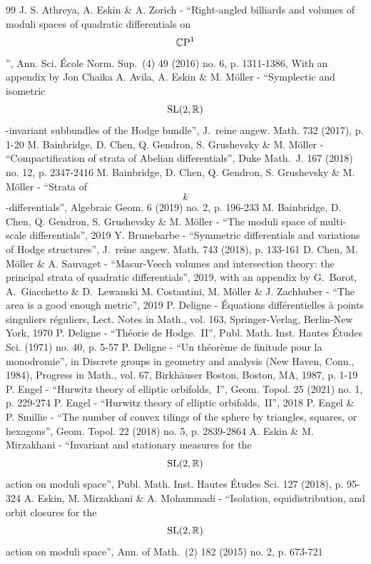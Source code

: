 \documentclass[10pt]{amsart}
\theoremstyle{plain}
\theoremstyle{definition}
\begin{document}
\begin{thebibliography}{99}
 J. S. Athreya, A. Eskin \& A. Zorich - “Right-angled billiards and volumes of moduli spaces of quadratic differentials on $$\mathbb{C}\rm P^1$$”, Ann. Sci. École Norm. Sup. (4) 49 (2016) no. 6, p. 1311-1386, With an appendix by Jon Chaika
 A. Avila, A. Eskin \& M. Möller - “Symplectic and isometric $${\rm SL}(2,\mathbb{R})$$-invariant subbundles of the Hodge bundle”, J. reine angew. Math. 732 (2017), p. 1-20
 M. Bainbridge, D. Chen, Q. Gendron, S. Grushevsky \& M. Möller - “Compactification of strata of Abelian differentials”, Duke Math. J. 167 (2018) no. 12, p. 2347-2416
 M. Bainbridge, D. Chen, Q. Gendron, S. Grushevsky \& M. Möller - “Strata of $$k$$-differentials”, Algebraic Geom. 6 (2019) no. 2, p. 196-233
 M. Bainbridge, D. Chen, Q. Gendron, S. Grushevsky \& M. Möller - “The moduli space of multi-scale differentials”, 2019
 Y. Brunebarbe - “Symmetric differentials and variations of Hodge structures”, J. reine angew. Math. 743 (2018), p. 133-161
 D. Chen, M. Möller \& A. Sauvaget - “Masur-Veech volumes and intersection theory: the principal strata of quadratic differentials”, 2019, with an appendix by G. Borot, A. Giacchetto \& D. Lewanski
 M. Costantini, M. Möller \& J. Zachhuber - “The area is a good enough metric”, 2019
 P. Deligne - Équations différentielles à points singuliers réguliers, Lect. Notes in Math., vol. 163, Springer-Verlag, Berlin-New York, 1970
 P. Deligne - “Théorie de Hodge. II”, Publ. Math. Inst. Hautes Études Sci. (1971) no. 40, p. 5-57
 P. Deligne - “Un théorème de finitude pour la monodromie”, in Discrete groups in geometry and analysis (New Haven, Conn., 1984), Progress in Math., vol. 67, Birkhäuser Boston, Boston, MA, 1987, p. 1-19
 P. Engel - “Hurwitz theory of elliptic orbifolds, I”, Geom. Topol. 25 (2021) no. 1, p. 229-274
 P. Engel - “Hurwitz theory of elliptic orbifolds, II”, 2018
 P. Engel \& P. Smillie - “The number of convex tilings of the sphere by triangles, squares, or hexagons”, Geom. Topol. 22 (2018) no. 5, p. 2839-2864
 A. Eskin \& M. Mirzakhani - “Invariant and stationary measures for the $${\rm SL}(2,\mathbb{R})$$ action on moduli space”, Publ. Math. Inst. Hautes Études Sci. 127 (2018), p. 95-324
 A. Eskin, M. Mirzakhani \& A. Mohammadi - “Isolation, equidistribution, and orbit closures for the $${\rm SL}(2,\mathbb{R})$$ action on moduli space”, Ann. of Math. (2) 182 (2015) no. 2, p. 673-721

\end{thebibliography}
\end{document}
